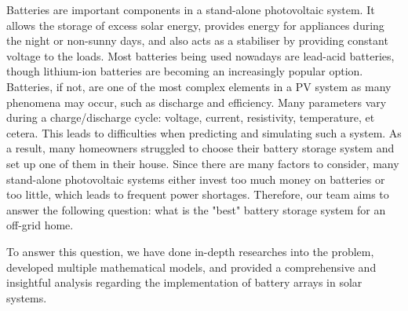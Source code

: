 Batteries are important components in a stand-alone photovoltaic system. It allows the storage of excess solar energy, provides energy for appliances during the night or non-sunny days, and also acts as a stabiliser by providing constant voltage to the loads. Most batteries being used nowadays are lead-acid batteries, though lithium-ion batteries are becoming an increasingly popular option. Batteries, if not, are one of the most complex elements in a PV system as many phenomena may occur, such as discharge and efficiency. Many parameters vary during a charge/discharge cycle: voltage, current, resistivity, temperature, et cetera. This leads to difficulties when predicting and simulating such a system. As a result, many homeowners struggled to choose their battery storage system and set up one of them in their house. Since there are many factors to consider, many stand-alone photovoltaic systems either invest too much money on batteries or too little, which leads to frequent power shortages. Therefore, our team aims to answer the following question: what is the "best" battery storage system for an off-grid home.

To answer this question, we have done in-depth researches into the problem, developed multiple mathematical models, and provided a comprehensive and insightful analysis regarding the implementation of battery arrays in solar systems.
